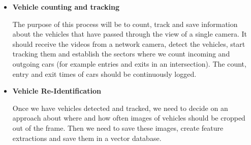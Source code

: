 \documentclass[conference]{IEEEtran} %
\begin{document}
		\begin{itemize}
			\item \textbf{Vehicle counting and tracking}
			
			 The purpose of this process will be to count, track and save information about the vehicles that have passed through the view of a single camera. It should receive the videos from a network camera, detect the vehicles, start tracking them and establish the sectors where we count incoming and outgoing cars (for example entries and exits in an intersection). The count, entry and exit times of cars should be continuously logged.
			\item \textbf{Vehicle Re-Identification}
			
			 Once we have vehicles detected and tracked, we need to decide on an approach about where and how often images of vehicles should be cropped out of the frame. Then we need to save these images, create feature extractions and save them in a vector database.
		\end{itemize}
	
\end{document}
